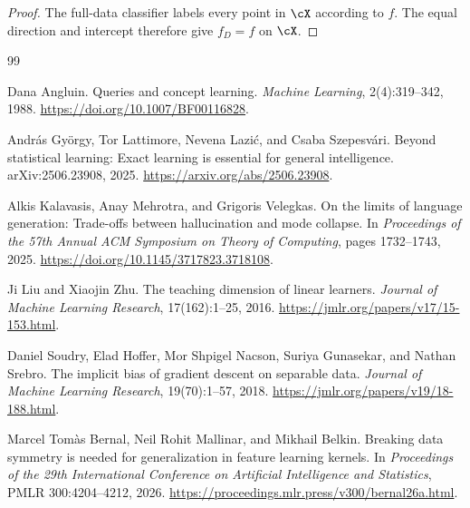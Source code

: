 \documentclass[11pt,twoside]{article}
\theoremstyle{definition}
\theoremstyle{remark}
\begin{document}
\begin{proof}
The full-data classifier labels every point in \(\cX\) according to \(f\).
The equal direction and intercept therefore give \(f_D=f\) on \(\cX\).
\end{proof}

\clearpage
\begin{thebibliography}{99}

Dana Angluin.
\newblock Queries and concept learning.
\newblock \emph{Machine Learning}, 2(4):319--342, 1988.
\newblock \url{https://doi.org/10.1007/BF00116828}.

Andr\'as Gy\"orgy, Tor Lattimore, Nevena Lazi\'c, and Csaba Szepesv\'ari.
\newblock Beyond statistical learning: Exact learning is essential for
general intelligence.
\newblock arXiv:2506.23908, 2025.
\newblock \url{https://arxiv.org/abs/2506.23908}.

Alkis Kalavasis, Anay Mehrotra, and Grigoris Velegkas.
\newblock On the limits of language generation: Trade-offs between
hallucination and mode collapse.
\newblock In \emph{Proceedings of the 57th Annual ACM Symposium on Theory of
Computing}, pages 1732--1743, 2025.
\newblock \url{https://doi.org/10.1145/3717823.3718108}.

Ji Liu and Xiaojin Zhu.
\newblock The teaching dimension of linear learners.
\newblock \emph{Journal of Machine Learning Research}, 17(162):1--25, 2016.
\newblock \url{https://jmlr.org/papers/v17/15-153.html}.

Daniel Soudry, Elad Hoffer, Mor Shpigel Nacson, Suriya Gunasekar, and
Nathan Srebro.
\newblock The implicit bias of gradient descent on separable data.
\newblock \emph{Journal of Machine Learning Research}, 19(70):1--57, 2018.
\newblock \url{https://jmlr.org/papers/v19/18-188.html}.

Marcel Tom\`as Bernal, Neil Rohit Mallinar, and Mikhail Belkin.
\newblock Breaking data symmetry is needed for generalization in feature
learning kernels.
\newblock In \emph{Proceedings of the 29th International Conference on
Artificial Intelligence and Statistics}, PMLR 300:4204--4212, 2026.
\newblock \url{https://proceedings.mlr.press/v300/bernal26a.html}.

\end{thebibliography}
\end{document}
